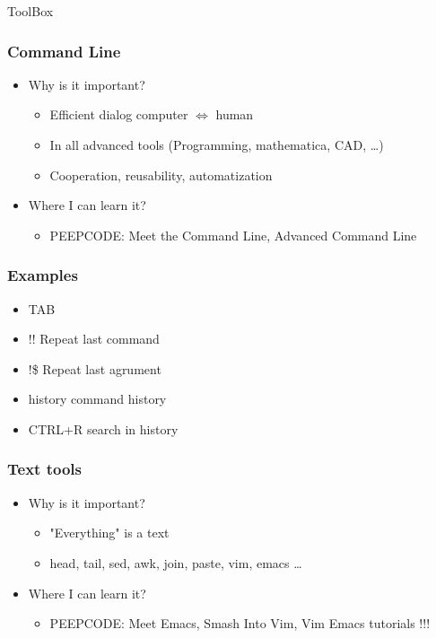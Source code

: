 \documentclass[fleqn]{beamer}
\begin{document}
\begin{section}{ToolBox}

  \begin{frame}\frametitle{Command Line}
  \begin{itemize}
    \item{Why is it important?}
    \begin{itemize}
      \item{Efficient dialog computer $\Longleftrightarrow$ human}
      \item{In all advanced tools (Programming, mathematica, CAD, \ldots)}
      \item{Cooperation, reusability, automatization }
    \end{itemize}

    \item{Where I can learn it?}
    \begin{itemize}
      \item PEEPCODE: Meet the Command Line, Advanced Command Line  
    \end{itemize}
  \end{itemize}





  \end{frame}

  \begin{frame}\frametitle{Examples}
  \begin{itemize}
    \item TAB 
    \item !! Repeat last command
    \item !\$ Repeat last agrument
    \item history command history
    \item CTRL+R search in history
  \end{itemize}
  \end{frame}

  
  \begin{frame}\frametitle{Text tools}
  \begin{itemize}
    \item{Why is it important?}
      \begin{itemize}
      \item "Everything" is a text
      \item head, tail, sed, awk, join, paste, vim, emacs \ldots
      \end{itemize}
 \item{Where I can learn it?}
  \begin{itemize}
      \item PEEPCODE: Meet Emacs, Smash Into Vim, Vim Emacs tutorials !!! 
  \end{itemize}
  \end{itemize}
  \end{frame}


\end{section}
\end{document}
